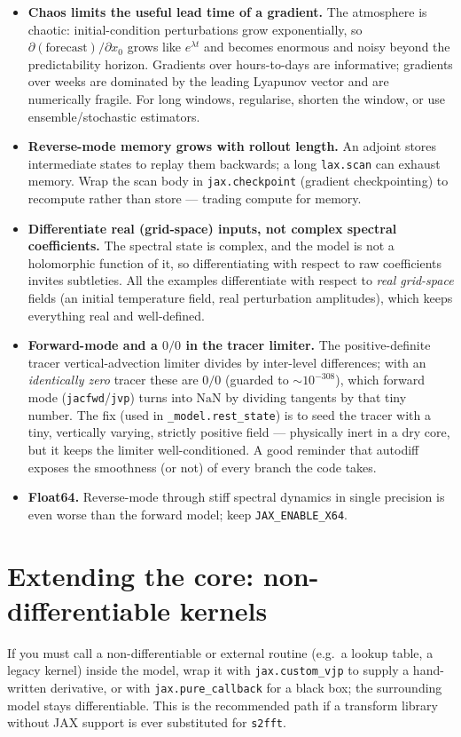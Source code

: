 \documentclass[11pt]{article}
\newcommand{\code}[1]{\texttt{#1}}
\begin{document}
\begin{itemize}
\item \textbf{Chaos limits the useful lead time of a gradient.} The atmosphere is
  chaotic: initial-condition perturbations grow exponentially, so
  $\partial(\text{forecast})/\partial x_0$ grows like $e^{\lambda t}$ and becomes
  enormous and noisy beyond the predictability horizon. Gradients over hours-to-days
  are informative; gradients over weeks are dominated by the leading Lyapunov
  vector and are numerically fragile. For long windows, regularise, shorten the
  window, or use ensemble/stochastic estimators.
\item \textbf{Reverse-mode memory grows with rollout length.} An adjoint stores
  intermediate states to replay them backwards; a long \code{lax.scan} can exhaust
  memory. Wrap the scan body in \code{jax.checkpoint} (gradient checkpointing) to
  recompute rather than store --- trading compute for memory.
\item \textbf{Differentiate real (grid-space) inputs, not complex spectral
  coefficients.} The spectral state is complex, and the model is not a holomorphic
  function of it, so differentiating with respect to raw coefficients invites
  subtleties. All the examples differentiate with respect to \emph{real grid-space}
  fields (an initial temperature field, real perturbation amplitudes), which keeps
  everything real and well-defined.
\item \textbf{Forward-mode and a $0/0$ in the tracer limiter.} The
  positive-definite tracer vertical-advection limiter divides by inter-level
  differences; with an \emph{identically zero} tracer these are $0/0$ (guarded to
  $\sim$$10^{-308}$), which forward mode (\code{jacfwd}/\code{jvp}) turns into
  $\text{NaN}$ by dividing tangents by that tiny number. The fix (used in
  \code{\_model.rest\_state}) is to seed the tracer with a tiny, vertically varying,
  strictly positive field --- physically inert in a dry core, but it keeps the
  limiter well-conditioned. A good reminder that autodiff exposes the smoothness
  (or not) of every branch the code takes.
\item \textbf{Float64.} Reverse-mode through stiff spectral dynamics in single
  precision is even worse than the forward model; keep \code{JAX\_ENABLE\_X64}.
\end{itemize}

\section{Extending the core: non-differentiable kernels}
If you must call a non-differentiable or external routine (e.g.\ a lookup table, a
legacy kernel) inside the model, wrap it with \code{jax.custom\_vjp} to supply a
hand-written derivative, or with \code{jax.pure\_callback} for a black box; the
surrounding model stays differentiable. This is the recommended path if a
transform library without JAX support is ever substituted for \code{s2fft}.
\end{document}
